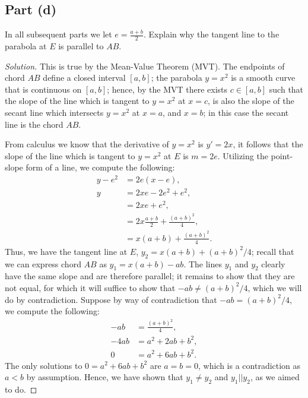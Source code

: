 \documentclass[letterpaper, 12pt]{amsart}
\theoremstyle{definition}  %
\begin{document}

		\subsection*{Part (d)}
		In all subsequent parts we let $e = \frac{a+b}{2}$. 
		Explain why the tangent line to the parabola at $E$ is parallel to $AB$.

		\begin{proof}[Solution]
		This is true by the Mean-Value Theorem (MVT).
		The endpoints of chord $AB$ define a closed interval $[a,b]$; the parabola $y = x^{2}$ is a smooth curve that is continuous on $[a,b]$; hence, by the MVT there exists $c \in [a,b]$ such that the slope of the line which is tangent to $y = x^{2}$ at $x = c$, is also the slope of the secant line which intersects $y = x^{2}$ at $x = a$, and $x = b$; in this case the secant line is the chord $AB$.

		From calculus we know that the derivative of $y = x^{2}$ is $y' = 2x$, it follows that the slope of the line which is tangent to $y = x^{2}$ at $E$ is $m = 2e$.
		Utilizing the point-slope form of a line, we compute the following:
			\begin{align*}
				y - e^{2} &= 2e(x-e), \\
				y &= 2xe - 2e^{2} + e^{2}, \\
				&= 2xe + e^{2}, \\
				&= 2x\frac{a+b}{2} + \frac{(a+b)^{2}}{4}, \\
				&= x(a+b) + \frac{(a+b)^{2}}{4}.
			\end{align*}
		Thus, we have the tangent line at $E$, $y_{2} = x(a+b) + (a+b)^{2}/4$; recall that we can express chord $AB$ as $y_{1} = x(a+b) - ab$.
		The lines $y_{1}$ and $y_{2}$ clearly have the same slope and are therefore parallel; it remains to show that they are not equal, for which it will suffice to show that $-ab \neq (a+b)^{2}/4$, which we will do by contradiction.
		Suppose by way of contradiction that $-ab = (a+b)^{2}/4$, we compute the following:
			\begin{align*}
				-ab &= \frac{(a+b)^2}{4}, \\
				-4ab &= a^{2} + 2ab + b^{2}, \\
				0 &= a^{2} + 6ab + b^{2}.
			\end{align*}
		The only solutions to $0 = a^{2} + 6ab + b^{2}$ are $a = b = 0$, which is a contradiction as $a < b$ by assumption.
		Hence, we have shown that $y_{1} \neq y_{2}$ and $y_{1} || y_{2}$, as we aimed to do.
		\end{proof}
\end{document}
